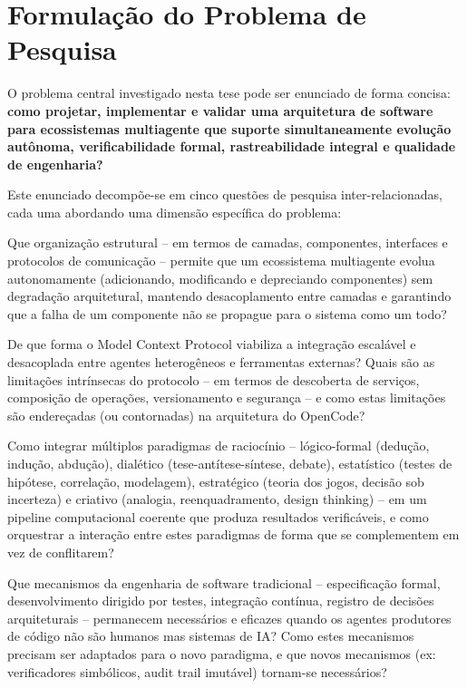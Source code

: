 \documentclass[12pt,a4paper,sumario=tradicional,openany]{abntex2}
\begin{document}
\section{Formulação do Problema de Pesquisa}

O problema central investigado nesta tese pode ser enunciado de forma concisa: \textbf{como projetar, implementar e validar uma arquitetura de software para ecossistemas multiagente que suporte simultaneamente evolução autônoma, verificabilidade formal, rastreabilidade integral e qualidade de engenharia?}

Este enunciado decompõe-se em cinco questões de pesquisa inter-relacionadas, cada uma abordando uma dimensão específica do problema:

\begin{description}[style=nextline,leftmargin=2cm,font=\normalfont]
    \item[QP1 -- Arquitetura:] Que organização estrutural -- em termos de camadas, componentes, interfaces e protocolos de comunicação -- permite que um ecossistema multiagente evolua autonomamente (adicionando, modificando e depreciando componentes) sem degradação arquitetural, mantendo desacoplamento entre camadas e garantindo que a falha de um componente não se propague para o sistema como um todo?
    
    \item[QP2 -- Interoperabilidade:] De que forma o Model Context Protocol viabiliza a integração escalável e desacoplada entre agentes heterogêneos e ferramentas externas? Quais são as limitações intrínsecas do protocolo -- em termos de descoberta de serviços, composição de operações, versionamento e segurança -- e como estas limitações são endereçadas (ou contornadas) na arquitetura do OpenCode?
    
    \item[QP3 -- Raciocínio:] Como integrar múltiplos paradigmas de raciocínio -- lógico-formal (dedução, indução, abdução), dialético (tese-antítese-síntese, debate), estatístico (testes de hipótese, correlação, modelagem), estratégico (teoria dos jogos, decisão sob incerteza) e criativo (analogia, reenquadramento, design thinking) -- em um pipeline computacional coerente que produza resultados verificáveis, e como orquestrar a interação entre estes paradigmas de forma que se complementem em vez de conflitarem?
    
    \item[QP4 -- Qualidade de Engenharia:] Que mecanismos da engenharia de software tradicional -- especificação formal, desenvolvimento dirigido por testes, integração contínua, registro de decisões arquiteturais -- permanecem necessários e eficazes quando os agentes produtores de código não são humanos mas sistemas de IA? Como estes mecanismos precisam ser adaptados para o novo paradigma, e que novos mecanismos (ex: verificadores simbólicos, audit trail imutável) tornam-se necessários?
    

\end{description}
\end{document}
